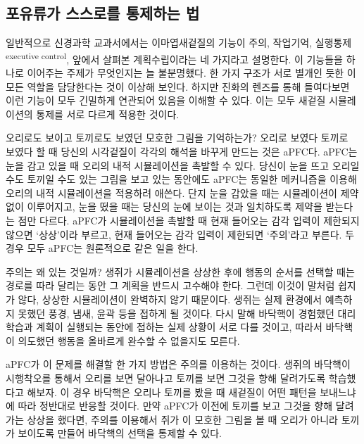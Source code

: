 \documentclass[openany]{book}
\begin{document}
\begin{appendices}
%   


\chapter{포유류가 스스로를 통제하는 법}

일반적으로 신경과학 교과서에서는 이마엽새겉질의 기능이 주의, 작업기억, 실행통제\textsuperscript{executive control}, 앞에서 살펴본 계획수립이라는 네 가지라고 설명한다. 이 기능들을 하나로 이어주는 주제가 무엇인지는 늘 불분명했다. 한 가지 구조가 서로 별개인 듯한 이 모든 역할을 담당한다는 것이 이상해 보인다. 하지만 진화의 렌즈를 통해 들여다보면 이런 기능이 모두 긴밀하게 연관되어 있음을 이해할 수 있다. 이는 모두 새겉질 시뮬레이션의 통제를 서로 다르게 적용한 것이다.

오리로도 보이고 토끼로도 보였던 모호한 그림을 기억하는가? 오리로 보였다 토끼로 보였다 할 때 당신의 시각겉질이 각각의 해석을 바꾸게 만드는 것은 aPFC다. aPFC는 눈을 감고 있을 때 오리의 내적 시뮬레이션을 촉발할 수 있다. 당신이 눈을 뜨고 오리일 수도 토끼일 수도 있는 그림을 보고 있는 동안에도 aPFC는 동일한 메커니즘을 이용해 오리의 내적 시뮬레이션을 적용하려 애쓴다. 단지 눈을 감았을 때는 시뮬레이션이 제약 없이 이루어지고, 눈을 떴을 때는 당신의 눈에 보이는 것과 일치하도록 제약을 받는다는 점만 다르다. aPFC가 시뮬레이션을 촉발할 때 현재 들어오는 감각 입력이 제한되지 않으면 `상상’이라 부르고, 현재 들어오는 감각 입력이 제한되면 `주의’라고 부른다. 두 경우 모두 aPFC는 원론적으로 같은 일을 한다.

주의는 왜 있는 것일까? 생쥐가 시뮬레이션을 상상한 후에 행동의 순서를 선택할 때는 경로를 따라 달리는 동안 그 계획을 반드시 고수해야 한다. 그런데 이것이 말처럼 쉽지가 않다, 상상한 시뮬레이션이 완벽하지 않기 때문이다. 생쥐는 실제 환경에서 예측하지 못했던 풍경, 냄새, 윤곽 등을 접하게 될 것이다. 다시 말해 바닥핵이 경험했던 대리 학습과 계획이 실행되는 동안에 접하는 실제 상황이 서로 다를 것이고, 따라서 바닥핵이 의도했던 행동을 올바르게 완수할 수 없을지도 모른다.

aPFC가 이 문제를 해결할 한 가지 방법은 주의를 이용하는 것이다. 생쥐의 바닥핵이 시행착오를 통해서 오리를 보면 달아나고 토끼를 보면 그것을 향해 달려가도록 학습했다고 해보자. 이 경우 바닥핵은 오리나 토끼를 봤을 때 새겉질이 어떤 패턴을 보내느냐에 따라 정반대로 반응할 것이다. 만약 aPFC가 이전에 토끼를 보고 그것을 향해 달려가는 상상을 했다면, 주의를 이용해서 쥐가 이 모호한 그림을 볼 때 오리가 아니라 토끼가 보이도록 만들어 바닥핵의 선택을 통제할 수 있다.


\end{appendices}
\end{document}
